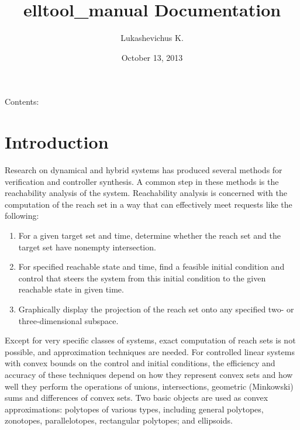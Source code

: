 \documentclass[letterpaper,10pt,english]{sphinxmanual}
\title{elltool\_manual Documentation}
\date{October 13, 2013}
\author{Lukashevichus K.}
\begin{document}
\maketitle
\tableofcontents
{}\label{main_manual::doc}


Contents:


\chapter{Introduction}
\label{chap_intro:introduction}\label{chap_intro:welcome-to-elltool-manual-s-documentation}\label{chap_intro::doc}
Research on dynamical and hybrid systems has produced several methods
for verification and controller synthesis. A common step in these
methods is the reachability analysis of the system. Reachability
analysis is concerned with the computation of the reach set in a way
that can effectively meet requests like the following:
\begin{enumerate}
\item {} 
For a given target set and time, determine whether the reach set and
the target set have nonempty intersection.

\item {} 
For specified reachable state and time, find a feasible initial
condition and control that steers the system from this initial
condition to the given reachable state in given time.

\item {} 
Graphically display the projection of the reach set onto any
specified two- or three-dimensional subspace.

\end{enumerate}

Except for very specific classes of systems, exact computation of reach
sets is not possible, and approximation techniques are needed. For
controlled linear systems with convex bounds on the control and initial
conditions, the efficiency and accuracy of these techniques depend on
how they represent convex sets and how well they perform the operations
of unions, intersections, geometric (Minkowski) sums and differences of
convex sets. Two basic objects are used as convex approximations:
polytopes of various types, including general polytopes, zonotopes,
parallelotopes, rectangular polytopes; and ellipsoids.
\end{document}
